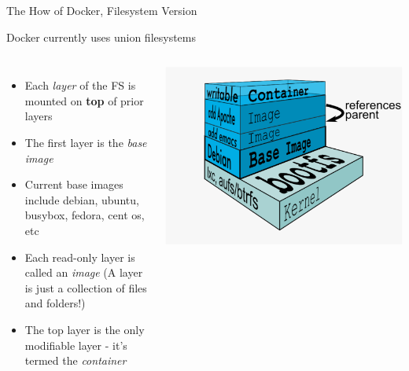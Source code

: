 \documentclass[xcolor=dvipsnames]{beamer}
\begin{document}
\begin{frame}{The How of Docker, Filesystem Version}

Docker currently uses union filesystems

\begin{columns}
  \begin{itemize}
  \item Each \textit{layer} of the FS is mounted on \textbf{top} of prior layers
  \item The first layer is the \textit{base image}
  \item Current base images include debian, ubuntu, busybox, fedora, cent os, etc
  \item Each read-only layer is called an \textit{image} (A layer is just a collection of files and folders!)
  \item The top layer is the only modifiable layer - it's termed the \textit{container}
  \end{itemize}
  \includegraphics[width=\textwidth]{figures/union-fs.pdf}
\end{columns} 

\end{frame}
\end{document}
